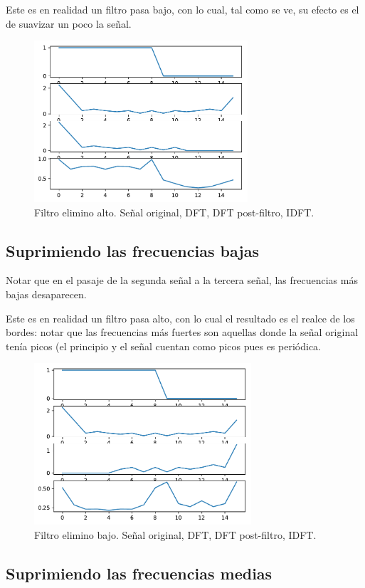\documentclass[11pt, spanish]{article}
\begin{document}
Este es en realidad un filtro pasa bajo, con lo cual, tal como se ve, su efecto es el de suavizar un poco la señal.
\begin{figure}[H]
\centering
  \includegraphics[height=6cm]{informe-imgs/ej2-elimino-alto.pdf}
  \caption{Filtro elimino alto. Señal original, DFT, DFT post-filtro, IDFT.}
\end{figure}

\subsection{Suprimiendo las frecuencias bajas}

Notar que en el pasaje de la segunda señal a la tercera señal, las frecuencias más bajas desaparecen.

Este es en realidad un filtro pasa alto, con lo cual el resultado es el realce de los bordes: notar que las frecuencias
más fuertes son aquellas donde la señal original tenía picos (el principio y el señal cuentan como picos pues es
periódica.

\begin{figure}[H]
\centering
  \includegraphics[height=6cm]{informe-imgs/ej2-elimino-bajo.pdf}
  \caption{Filtro elimino bajo. Señal original, DFT, DFT post-filtro, IDFT.}
\end{figure}

\subsection{Suprimiendo las frecuencias medias}
\end{document}
